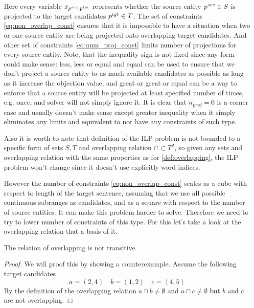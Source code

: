 Here every variable \( x_{p^{src}, p^{tgt}} \) represents whether the source entity \( p^{src} \in S \)
is projected to the target candidates \( p^{tgt} \in T \).
The set of constraints \eqref{eq:non_overlap_const} ensures that it is impossible to have a situation when
two or one source entity are being projected onto overlapping target candidates.
And other set of constraints \eqref{eq:num_proj_const} limits number of projections
for every source entity. Note, that the inequality sign is not fixed since any form
could make sense: less, less or equal and equal can be used to ensure that we don't
project a source entity to as much available candidates as possible as long as it
increase the objection value, and great or great or equal can be a way to enforce
that a source entiry will be projected at least specified number of times, e.g. once,
and solver will not simply ignore it. It is clear that \( n_{proj} = 0 \) is a corner
case and usually doesn't make sense except greater inequality when it simply
eliminates any limits and equivalent to not have any constraints of such type.

Also it is worth to note that definition of the ILP problem is not bounded to a specific form of sets \( S, T \)
and overlapping relation \( \cap \subset T^2 \), so given any sets and overlapping relation with the same properties
as for \ref{def:overlapping}, the ILP problem won't change since it doesn't use explicitly word indices.

However the number of constraints \eqref{eq:non_overlap_const} scales as a cube with respect to
length of the target sentence, assuming that we use all possible continuous subranges as candidates, and as
a square with respect to the number of source entities.
It can make this problem harder to solve. Therefore we need to try to lower number of constraints
of this type. For this let's take a look at the overlapping relation that a basis of it.
\begin{lemma} \label{lemma:not_transitive}
    The relation of overlapping is not transitive.
\end{lemma}
\begin{proof}
    We will proof this by showing a counterexample.
    Assume the following target candidates
    \[
        a = (2, 4) \quad b = (1, 2) \quad c = (4, 5)
    \]
    By the definition of the overlapping relation \( a \cap b \neq \emptyset \) and
    \( a \cap c \neq \emptyset \) but \( b \) and \( c \) are not overlapping.
\end{proof}

